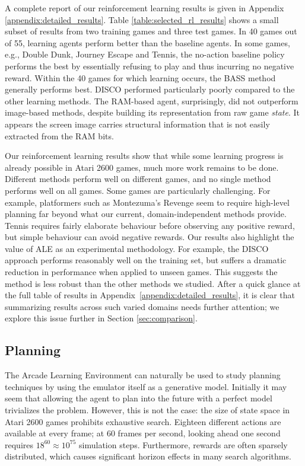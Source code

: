 \documentclass[twoside,11pt]{article}
\newcommand{\gamename}[1]{{\sc #1}}
\begin{document}
A complete report of our reinforcement learning results is given in Appendix 
\ref{appendix:detailed_results}. Table \ref{table:selected_rl_results} shows a small subset of 
results from two training games and three test games.  In 40 games out of 55, learning agents perform 
better than the baseline agents.  In some games, e.g., \gamename{Double Dunk}, \gamename{Journey Escape} and \gamename{Tennis}, the no-action baseline policy performs the best by essentially refusing to play and thus incurring no negative reward.  Within the 40 games for which learning occurs, the BASS method
generally performs best. DISCO performed particularly poorly compared to the other learning methods. 
The RAM-based agent, surprisingly, did not outperform image-based methods, despite building its representation from raw game {\em state}. It appears the screen image carries structural information that is not easily extracted from the RAM bits.

Our reinforcement learning results show that while some learning progress is already possible in Atari 2600 games, much more work remains to be done. 
Different methods perform well on different games, and no single method performs well on all games. 
Some games are particularly challenging.  For example, platformers such as \gamename{Montezuma's Revenge} seem to require high-level planning far beyond what our current, domain-independent methods provide.  \gamename{Tennis} requires fairly elaborate behaviour before observing any positive reward, but simple behaviour can avoid negative rewards.  Our results also highlight the value of ALE as an experimental methodology.
For example, the DISCO approach performs reasonably well on the training set, but suffers a dramatic reduction in performance when applied to unseen games.
This suggests the method is less robust than the other methods we studied.  After a quick glance at the full table of results in Appendix~\ref{appendix:detailed_results}, it is clear that summarizing results across such varied domains needs further attention; we explore this issue further in Section \ref{sec:comparison}. 

\subsection{Planning}
\label{sec:planning}

The Arcade Learning Environment can naturally be used to study planning techniques by using the emulator itself as a generative model. 
Initially it may seem that allowing the agent to plan into the future with a perfect model trivializes the problem.
However, this is not the case: the size of state space in Atari 2600 games prohibits exhaustive search. 
Eighteen different actions are available at every frame; at 60 frames per second, looking ahead one second requires $18^{60} \approx 10^{75}$ simulation steps.
Furthermore, rewards are often sparsely distributed, which causes significant horizon effects in many search algorithms. 
\end{document}
